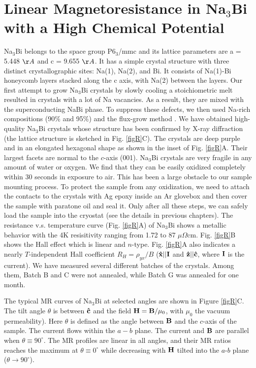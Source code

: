 \section{Linear Magnetoresistance in Na$_3$Bi with a High Chemical Potential}
\label{sec:na3bi:lmr}


Na$_3$Bi belongs to the space group P6$_3$/mmc and its lattice parameters are a = 5.448 $\AA$ and c = 9.655 $\AA$. It has a simple crystal structure with three distinct crystallographic sites: Na(1), Na(2), and Bi. It consists of Na(1)-Bi honeycomb layers stacked along the c axis, with Na(2) between the layers. Our first attempt to grow Na$_3$Bi crystals by slowly cooling a stoichiometric melt resulted in crystals with a lot of Na vacancies. As a result, they are mixed with the superconducting NaBi phase. To suppress these defects, we then used Na-rich compositions (90$\%$ and 95$\%$) and the flux-grow method \cite{Kushwaha}. We have obtained high-quality Na$_3$Bi crystals whose structure has been confirmed by X-ray diffraction (the lattice structure is sketched in Fig. \ref{figR}C). The crystals are deep purple and in an elongated hexagonal shape as shown in the inset of Fig. \ref{figR}A. Their largest facets are normal to the $c$-axis (001). Na$_3$Bi crystals are very fragile in any amount of water or oxygen. We find that they can be easily oxidized completely within 30 seconds in exposure to air. This has been a large obstacle to our sample mounting process. To protect the sample from any oxidization, we need to attach the contacts to the crystals with Ag epoxy inside an Ar glovebox and then cover the sample with paratone oil and seal it. Only after all these steps, we can safely load the sample into the cryostat (see the details in previous chapters). The resistance v.s. temperature curve (Fig. \ref{figR}A) of Na$_3$Bi shows a metallic behavior with the 4K resisitivity ranging from 1.72 to 87 $\mu\Omega$cm. Fig. \ref{figR}B shows the Hall effect which is linear and $n$-type. Fig. \ref{figR}A also indicates a nearly $T$-independent Hall coefficient $R_H = \rho_{yx}/B$ ($\bf\hat{x}||I$ and $\bf\hat{z}||\hat{c}$, where $\bf I$ is the current). We have measured several different batches of the crystals. Among them, Batch B and C were not annealed, while Batch G was annealed for one month. 

The typical MR curves of Na$_3$Bi at selected angles are shown in Figure \ref{figR}C. The tilt angle $\theta$ is between $\bf\hat{c}$ and the field ${\bf H}={\bf B}/\mu_0$, with $\mu_0$ the vacuum permeability). Here $\theta$ is defined as the angle between $\bf B$ and the $c$-axis of the sample. The current flows within the $a-b$ plane. The current and $\bf B$ are parallel when $\theta \equiv 90^\circ$. The MR profiles are linear in all angles, and their MR ratios reaches the maximum at $\theta \equiv 0^\circ$ while decreasing with $\bf H$ tilted into the $a$-$b$ plane ($\theta\to 90^\circ$). 

